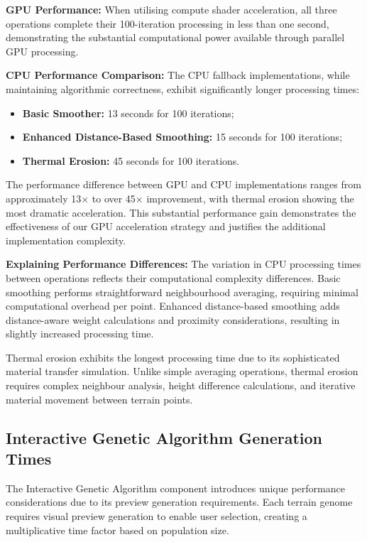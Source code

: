 \textbf{GPU Performance:} When utilising compute shader acceleration, all three operations complete their 100-iteration processing in less than one second, demonstrating the substantial computational power available through parallel GPU processing.

\textbf{CPU Performance Comparison:} The CPU fallback implementations, while maintaining algorithmic correctness, exhibit significantly longer processing times:

\begin{itemize}
    \item \textbf{Basic Smoother:} 13 seconds for 100 iterations;
    \item \textbf{Enhanced Distance-Based Smoothing:} 15 seconds for 100 iterations;  
    \item \textbf{Thermal Erosion:} 45 seconds for 100 iterations.
\end{itemize}

The performance difference between GPU and CPU implementations ranges from approximately 13× to over 45× improvement, with thermal erosion showing the most dramatic acceleration. This substantial performance gain demonstrates the effectiveness of our GPU acceleration strategy and justifies the additional implementation complexity.

\textbf{Explaining Performance Differences:} The variation in CPU processing times between operations reflects their computational complexity differences. Basic smoothing performs straightforward neighbourhood averaging, requiring minimal computational overhead per point. Enhanced distance-based smoothing adds distance-aware weight calculations and proximity considerations, resulting in slightly increased processing time.

Thermal erosion exhibits the longest processing time due to its sophisticated material transfer simulation. Unlike simple averaging operations, thermal erosion requires complex neighbour analysis, height difference calculations, and iterative material movement between terrain points. 

\subsection{Interactive Genetic Algorithm Generation Times}

The Interactive Genetic Algorithm component introduces unique performance considerations due to its preview generation requirements. Each terrain genome requires visual preview generation to enable user selection, creating a multiplicative time factor based on population size.

